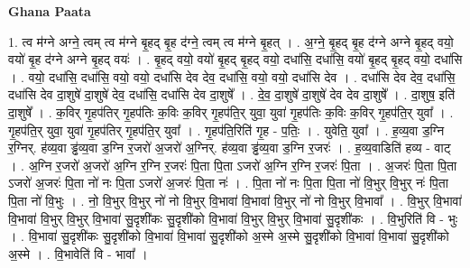\documentclass[17pt]{extarticle}
\begin{document}
\textbf{Ghana Paata } \newline

1. त्व म॑ग्ने अग्ने॒ त्वम् त्व म॑ग्ने बृ॒हद् बृ॒ह द॑ग्ने॒ त्वम् त्व म॑ग्ने बृ॒हत् । . अ॒ग्ने॒ बृ॒हद् बृ॒ह द॑ग्ने अग्ने बृ॒हद् वयो॒ वयो॑ बृ॒ह द॑ग्ने अग्ने बृ॒हद् वयः॑ । . बृ॒हद् वयो॒ वयो॑ बृ॒हद् बृ॒हद् वयो॒ दधा॑सि॒ दधा॑सि॒ वयो॑ बृ॒हद् बृ॒हद् वयो॒ दधा॑सि । . वयो॒ दधा॑सि॒ दधा॑सि॒ वयो॒ वयो॒ दधा॑सि देव देव॒ दधा॑सि॒ वयो॒ वयो॒ दधा॑सि देव । . दधा॑सि देव देव॒ दधा॑सि॒ दधा॑सि देव दा॒शुषे॑ दा॒शुषे॑ देव॒ दधा॑सि॒ दधा॑सि देव दा॒शुषे᳚ । . दे॒व॒ दा॒शुषे॑ दा॒शुषे॑ देव देव दा॒शुषे᳚ । . दा॒शुष॒ इति॑ दा॒शुषे᳚ । . क॒विर् गृ॒हप॑तिर् गृ॒हप॑तिः क॒विः क॒विर् गृ॒हप॑ति॒र् युवा॒ युवा॑ गृ॒हप॑तिः क॒विः क॒विर् गृ॒हप॑ति॒र् युवा᳚ । . गृ॒हप॑ति॒र् युवा॒ युवा॑ गृ॒हप॑तिर् गृ॒हप॑ति॒र् युवा᳚ । . गृ॒हप॑ति॒रिति॑ गृ॒ह - प॒तिः॒ । . युवेति॒ युवा᳚ । . ह॒व्य॒वा ड॒ग्नि र॒ग्निर्. ह॑व्य॒वा ड्ढ॑व्य॒वा ड॒ग्नि र॒जरो॑ अ॒जरो॑ अ॒ग्निर्. ह॑व्य॒वा ड्ढ॑व्य॒वा ड॒ग्नि र॒जरः॑ । . ह॒व्य॒वाडिति॑ हव्य - वाट् । . अ॒ग्नि र॒जरो॑ अ॒जरो॑ अ॒ग्नि र॒ग्नि र॒जरः॑ पि॒ता पि॒ता ऽजरो॑ अ॒ग्नि र॒ग्नि र॒जरः॑ पि॒ता । . अ॒जरः॑ पि॒ता पि॒ता ऽजरो॑ अ॒जरः॑ पि॒ता नो॑ नः पि॒ता ऽजरो॑ अ॒जरः॑ पि॒ता नः॑ । . पि॒ता नो॑ नः पि॒ता पि॒ता नो॑ वि॒भुर् वि॒भुर् नः॑ पि॒ता पि॒ता नो॑ वि॒भुः । . नो॒ वि॒भुर् वि॒भुर् नो॑ नो वि॒भुर् वि॒भावा॑ वि॒भावा॑ वि॒भुर् नो॑ नो वि॒भुर् वि॒भावा᳚ । . वि॒भुर् वि॒भावा॑ वि॒भावा॑ वि॒भुर् वि॒भुर् वि॒भावा॑ सु॒दृशी॑कः सु॒दृशी॑को वि॒भावा॑ वि॒भुर् वि॒भुर् वि॒भावा॑ सु॒दृशी॑कः । . वि॒भुरिति॑ वि - भुः । . वि॒भावा॑ सु॒दृशी॑कः सु॒दृशी॑को वि॒भावा॑ वि॒भावा॑ सु॒दृशी॑को अ॒स्मे अ॒स्मे सु॒दृशी॑को वि॒भावा॑ वि॒भावा॑ सु॒दृशी॑को अ॒स्मे । . वि॒भावेति॑ वि - भावा᳚ । \newline
\end{document}
